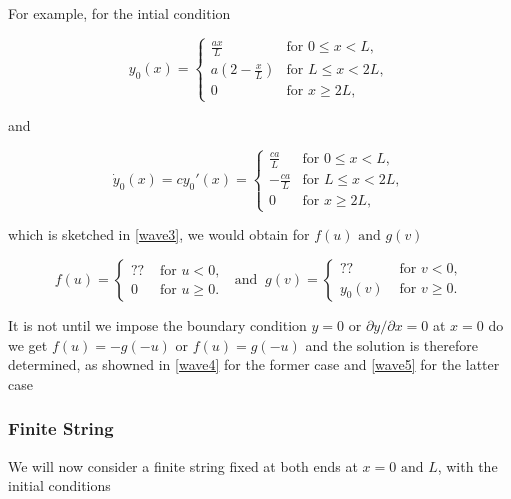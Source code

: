 \documentclass[a4paper,12pt]{report}
\begin{document}
For example, for the intial condition 

\begin{equation}
	y_0(x) =
\begin{cases}
    \frac{ax}{L} & \text{for } 0 \leq x < L, \\
    a\left(2 - \frac{x}{L}\right) & \text{for } L \leq x < 2L, \\
    0 & \text{for } x \geq 2L,
\end{cases}
\end{equation}

and

\begin{equation}
	\dot{y}_0(x) = c y_0'(x) =
\begin{cases}
    \frac{ca}{L} & \text{for } 0 \leq x < L, \\
    -\frac{ca}{L} & \text{for } L \leq x < 2L, \\
    0 & \text{for } x \geq 2L,
\end{cases}
\end{equation}

which is sketched in \cref{wave3}, we would obtain for \(f(u) \text { and }  g(v)\) 

\begin{equation}
	f(u) = \begin{cases}
		?? &\text{ for } u<0,\\
		0 &\text{ for } u \ge 0.
	\end{cases} ~\text { and }~ g(v) = \begin{cases}
		?? &\text{ for } v<0,\\
		y_0 (v) &\text{ for } v \ge 0.
	\end{cases}
\end{equation}


It is not until we impose the boundary condition \(y= 0 \text { or } \partial y/\partial x = 0\) at \(x=0\) do we get \(f(u) = -g(-u) \text { or } f(u) = g(-u)\) and the solution is therefore determined, as showned in \cref{wave4} for the former case and \cref{wave5} for the latter case



\subsubsection{Finite String}

We will now consider a finite string fixed at both ends at \(x= 0 \text { and } L\), with the initial conditions
\end{document}
